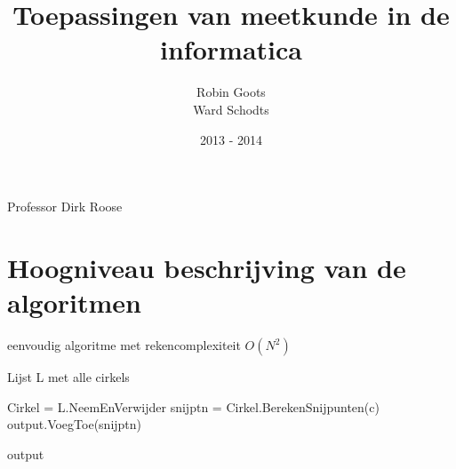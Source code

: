 \documentclass[11pt,a4paper]{article}
\begin{document}
\begin{titlepage}

\title{\Huge Toepassingen van meetkunde in de informatica}

\author{Robin Goots\\
		Ward Schodts\\
		}

\date{2013 - 2014}
\maketitle
\thispagestyle{empty}


\begin{center}
\Large Professor Dirk Roose
\vfill
\end{center}
\end{titlepage}

\section{Hoogniveau beschrijving van de algoritmen}

\begin{algorithm}
\caption{eenvoudig algoritme met rekencomplexiteit $O(N^2)$}
\begin{algorithmic}
\State Lijst L met alle cirkels

	\State Cirkel = L.NeemEnVerwijder
	\State snijptn = Cirkel.BerekenSnijpunten(c)
	\State output.VoegToe(snijptn)
	\EndFor
\EndWhile

\Return output
\end{algorithmic}
\end{algorithm}
\end{document}
